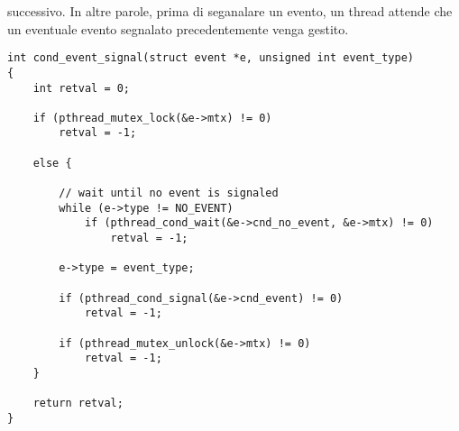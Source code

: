 successivo. In altre parole, prima di seganalare un evento, un thread attende 
che un eventuale evento segnalato precedentemente venga gestito.
%
\begin{lstlisting}[title=event.c]
int cond_event_signal(struct event *e, unsigned int event_type)
{
    int retval = 0;

    if (pthread_mutex_lock(&e->mtx) != 0)
        retval = -1;

    else {

        // wait until no event is signaled
        while (e->type != NO_EVENT)
            if (pthread_cond_wait(&e->cnd_no_event, &e->mtx) != 0)
                retval = -1;

        e->type = event_type;

        if (pthread_cond_signal(&e->cnd_event) != 0)
            retval = -1;

        if (pthread_mutex_unlock(&e->mtx) != 0)
            retval = -1;
    }

    return retval;
}
\end{lstlisting}

